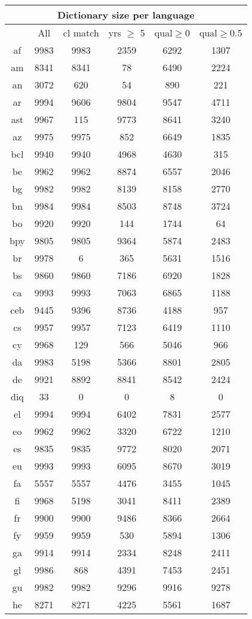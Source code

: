 \begin{figure}[h]
\centering
\begin{tabular}{cccccc}
\multicolumn{6}{c}{Dictionary size per language}\\
\hline\hline
&All&cl match&yrs $\geq$ 5&qual$\geq$0&qual$\geq$0.5\\
\hline\hline
af&9983&9983&2359&6292&1307\\
am&8341&8341&78&6490&2224\\
an&3072&620&54&890&221\\
ar&9994&9606&9804&9547&4711\\
ast&9967&115&9773&8641&3240\\
az&9975&9975&852&6649&1835\\
bcl&9940&9940&4968&4630&315\\
be&9962&9962&8874&6557&2046\\
bg&9982&9982&8139&8158&2770\\
bn&9984&9984&8503&8748&3724\\
bo&9920&9920&144&1744&64\\
bpy&9805&9805&9364&5874&2483\\
br&9978&6&365&5631&1516\\
bs&9860&9860&7186&6920&1828\\
ca&9993&9993&7063&6865&1188\\
ceb&9445&9396&8736&4188&957\\
cs&9957&9957&7123&6419&1110\\
cy&9968&129&566&5046&966\\
da&9983&5198&5366&8801&2805\\
de&9921&8892&8841&8542&2424\\
diq&33&0&0&8&0\\
el&9994&9994&6402&7831&2577\\
eo&9962&9962&3320&6722&1210\\
es&9835&9835&9772&8020&2071\\
eu&9993&9993&6095&8670&3019\\
fa&5557&5557&4476&3455&1045\\
fi&9968&5198&3041&8411&2389\\
fr&9900&9900&9486&8366&2664\\
fy&9959&9959&530&5894&1306\\
ga&9914&9914&2334&8248&2411\\
gl&9986&868&4391&7453&2451\\
gu&9982&9982&9296&9916&9278\\
he&8271&8271&4225&5561&1687\\

\end{tabular}
\end{figure}
